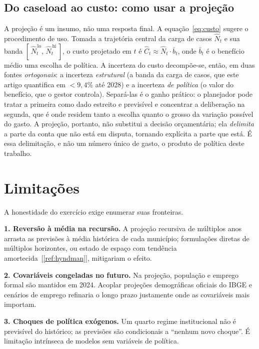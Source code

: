 \documentclass[12pt,a4paper,oneside]{article}
\newcommand{\C}[1]{[\ref{#1}]}
\begin{document}
\subsection{Do caseload ao custo: como usar a projeção}

A projeção é um insumo, não uma resposta final. A equação~\eqref{eq:custo}
sugere o procedimento de uso. Tomada a trajetória central da carga de
casos $\widehat{N}_t$ e sua banda
$[\,\widehat{N}_t^{\,\text{lo}},\,\widehat{N}_t^{\,\text{hi}}\,]$, o custo
projetado em $t$ é $\widehat{C}_t\approx \widehat{N}_t\cdot \bar{b}_t$, onde
$\bar{b}_t$ é o benefício médio \textemdash{} uma escolha de política. A
incerteza do custo decompõe-se, então, em duas fontes \emph{ortogonais}: a
incerteza \emph{estrutural} (a banda da carga de casos, que este artigo
quantifica em ${<}9{,}4\%$ até 2028) e a incerteza \emph{de política} (o
valor do benefício, que o gestor controla). Separá-las é o ganho
prático: o planejador pode tratar a primeira como dado \textemdash{}
estreito e previsível \textemdash{} e concentrar a deliberação na segunda,
que é onde residem tanto a escolha quanto o grosso da variação possível do
gasto. A projeção, portanto, não substitui a decisão orçamentária; ela
\emph{delimita} a parte da conta que não está em disputa, tornando
explícita a parte que está. É essa delimitação, e não um número único de
gasto, o produto de política deste trabalho.

\section{Limitações}
\label{sec:limitacoes}

A honestidade do exercício exige enumerar suas fronteiras.

\textbf{1. Reversão à média na recursão.} A projeção recursiva de múltiplos
anos arrasta as previsões à média histórica de cada município; formulações
diretas de múltiplos horizontes, ou estado de espaço com tendência
amortecida~\C{ref:hyndman}, mitigariam o efeito.

\textbf{2. Covariáveis congeladas no futuro.} Na projeção, população e
emprego formal são mantidos em 2024. Acoplar projeções demográficas
oficiais do IBGE e cenários de emprego refinaria o longo prazo
\textemdash{} justamente onde as covariáveis mais importam.

\textbf{3. Choques de política exógenos.} Um quarto regime institucional
não é previsível do histórico; as previsões são condicionais a ``nenhum
novo choque''. É limitação intrínseca de modelos sem variáveis de política.
\end{document}
